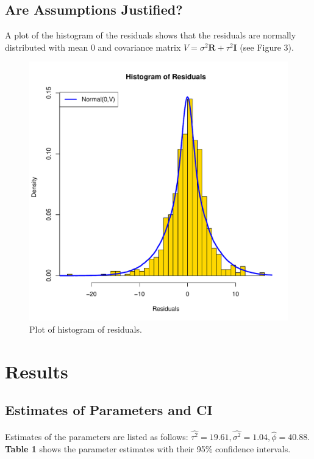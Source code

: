 \documentclass{article}                                                   %
\begin{document}
  \subsection{Are Assumptions Justified?}
    A plot of the histogram of the residuals shows that the residuals are normally
    distributed with mean 0 and covariance matrix $V = \sigma^2\bm R + \tau^2\bm I$
    (see Figure 3).
    \begin{figure}\begin{center}
      \includegraphics{raw/hist.pdf}
      \caption{Plot of histogram of residuals.}
    \end{center}\end{figure}

\section{Results}
  \subsection{Estimates of Parameters and CI}
    Estimates of the parameters are listed as follows: 
    $ \hat{\tau^2} = 19.61, \hat{\sigma^2} = 1.04, \hat{\phi} = 40.88 $.
    \textbf{Table 1} shows the parameter estimates with their 
    95\% confidence intervals.
\end{document}

